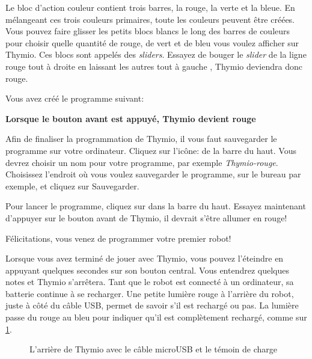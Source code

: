 Le bloc d'action couleur contient trois barres, la rouge, la verte et la bleue. En mélangeant ces trois couleurs primaires, toute les couleurs peuvent être créées. Vous pouvez faire glisser les petits blocs blancs le long des barres de couleurs pour choisir quelle quantité de rouge, de vert et de bleu vous voulez afficher sur Thymio. Ces blocs sont appelés des \textit{sliders}. Essayez de bouger le \textit{slider} de la ligne rouge tout à droite en laissant les autres tout à gauche , Thymio deviendra donc rouge.

Vous avez créé le programme suivant:

\begin{center}
	\textbf{Lorsque le bouton avant est appuyé, Thymio devient rouge}
\end{center}


Afin de finaliser la programmation de Thymio, il vous faut sauvegarder le programme sur votre ordinateur. Cliquez sur l'icône:  de la barre du haut. Vous devrez choisir un nom pour votre programme, par exemple \textit{Thymio-rouge}. Choisissez l'endroit où vous voulez sauvegarder le programme, sur le bureau par exemple, et cliquez sur Sauvegarder.


Pour lancer le programme, cliquez sur  dans la barre du haut. Essayez maintenant d'appuyer sur le bouton avant de Thymio, il devrait s'être allumer en rouge!

Félicitations, vous venez de programmer votre premier robot!


Lorsque vous avez terminé de jouer avec Thymio, vous pouvez l'éteindre en appuyant quelques secondes sur son bouton central. Vous entendrez quelques notes et Thymio s'arrêtera. Tant que le robot est connecté à un ordinateur, sa batterie continue à se recharger. Une petite lumière rouge à l'arrière du robot, juste à côté du câble USB, permet de savoir s'il est rechargé ou pas. La lumière passe du rouge au bleu pour indiquer qu'il est complètement rechargé, comme sur \cref{fig.back}.

\begin{figure}[h]
\begin{center}
\caption{L'arrière de Thymio avec le câble microUSB et le témoin de charge}\label{fig.back}
\end{center}
\end{figure}

